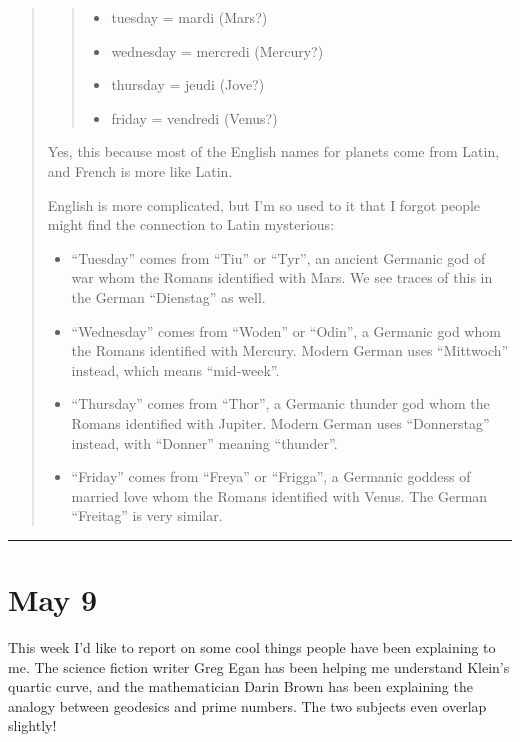 \documentclass{article}
\def\tightlist{}
\begin{document}
\begin{quote}
\begin{quote}
\begin{itemize}
\tightlist
\item
  tuesday = mardi (Mars?)
\item
  wednesday = mercredi (Mercury?)
\item
  thursday = jeudi (Jove?)
\item
  friday = vendredi (Venus?)
\end{itemize}
\end{quote}

Yes, this because most of the English names for planets come from Latin,
and French is more like Latin.

English is more complicated, but I'm so used to it that I forgot people
might find the connection to Latin mysterious:

\begin{itemize}
\tightlist
\item
  ``Tuesday'' comes from ``Tiu'' or ``Tyr'', an ancient Germanic god of
  war whom the Romans identified with Mars. We see traces of this in the
  German ``Dienstag'' as well.
\item
  ``Wednesday'' comes from ``Woden'' or ``Odin'', a Germanic god whom
  the Romans identified with Mercury. Modern German uses ``Mittwoch''
  instead, which means ``mid-week''.
\item
  ``Thursday'' comes from ``Thor'', a Germanic thunder god whom the
  Romans identified with Jupiter. Modern German uses ``Donnerstag''
  instead, with ``Donner'' meaning ``thunder''.
\item
  ``Friday'' comes from ``Freya'' or ``Frigga'', a Germanic goddess of
  married love whom the Romans identified with Venus. The German
  ``Freitag'' is very similar.
\end{itemize}
\end{quote}

\begin{center}\rule{0.5\linewidth}{0.5pt}\end{center}



\hypertarget{week215}{%
\section{May 9}\label{week215}}

This week I'd like to report on some cool things people have been
explaining to me. The science fiction writer Greg Egan has been helping
me understand Klein's quartic curve, and the mathematician Darin Brown
has been explaining the analogy between geodesics and prime numbers. The
two subjects even overlap slightly!
\end{document}
